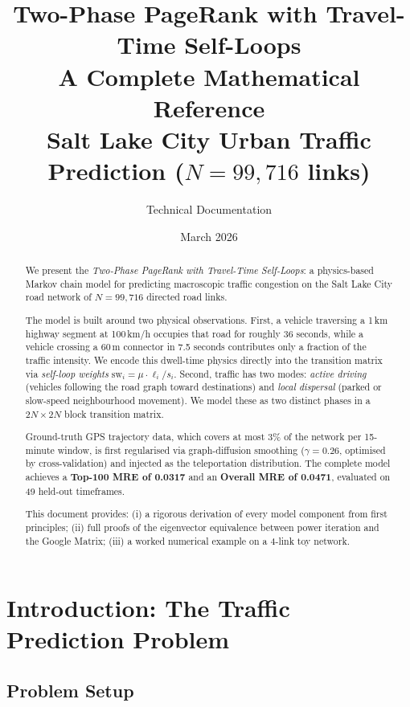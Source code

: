 \documentclass[12pt,a4paper]{article}
\title{%
  \textbf{Two-Phase PageRank with Travel-Time Self-Loops}\\[4pt]
  \large A Complete Mathematical Reference\\[2pt]
  \small Salt Lake City Urban Traffic Prediction ($N = 99{,}716$ links)
}
\author{Technical Documentation}
\date{March 2026}
\theoremstyle{definition}
\theoremstyle{plain}
\newcommand{\sw}{\mathrm{sw}}
\begin{document}
\maketitle
\begin{abstract}
We present the \emph{Two-Phase PageRank with Travel-Time Self-Loops}: a physics-based
Markov chain model for predicting macroscopic traffic congestion on the Salt Lake City
road network of $N = 99{,}716$ directed road links.

The model is built around two physical observations. First, a vehicle traversing a
1\,km highway segment at 100\,km/h occupies that road for roughly 36 seconds, while a
vehicle crossing a 60\,m connector in 7.5 seconds contributes only a fraction of the
traffic intensity. We encode this dwell-time physics directly into the transition matrix
via \emph{self-loop weights} $\sw_i = \mu \cdot \ell_i / s_i$. Second, traffic has two
modes: \emph{active driving} (vehicles following the road graph toward destinations) and
\emph{local dispersal} (parked or slow-speed neighbourhood movement). We model these
as two distinct phases in a $2N\!\times\!2N$ block transition matrix.

Ground-truth GPS trajectory data, which covers at most $3\%$ of the network per
15-minute window, is first regularised via graph-diffusion smoothing ($\gamma=0.26$,
optimised by cross-validation) and injected as the teleportation distribution. The
complete model achieves a \textbf{Top-100 MRE of 0.0317} and an \textbf{Overall MRE of
0.0471}, evaluated on 49 held-out timeframes.

This document provides: (i) a rigorous derivation of every model component from first
principles; (ii) full proofs of the eigenvector equivalence between power iteration and
the Google Matrix; (iii) a worked numerical example on a 4-link toy network.
\end{abstract}

\tableofcontents
\newpage

\section{Introduction: The Traffic Prediction Problem}

\subsection{Problem Setup}
\end{document}

